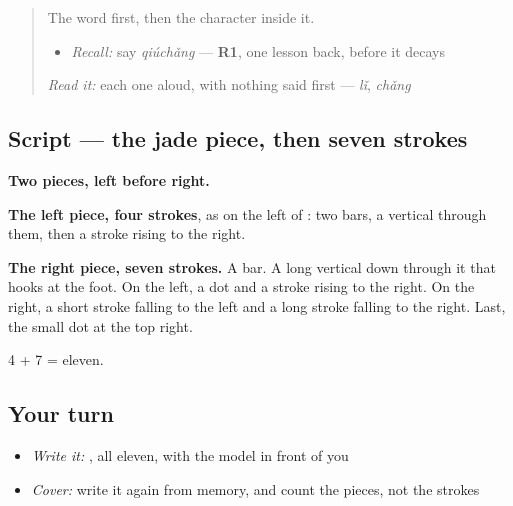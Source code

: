 \label{lesson:ZH-W498-qiu-ball}



\begin{quote}
The word first, then the character inside it.

\begin{itemize}
\raggedright
  \item \emph{Recall:} say \emph{qiúchǎng} — \textbf{R1}, one lesson back, before it decays
\end{itemize}

\begin{quote}
 
\end{quote}

\emph{Read it:} each one aloud, with nothing said first — \emph{lǐ}, \emph{chǎng}
\end{quote}

\subsection*{Script — the jade piece, then seven strokes}

\begin{quote}
\end{quote}

\textbf{Two pieces, left before right.}

\textbf{The left piece, four strokes}, as on the left of : two bars, a vertical through them, then a stroke rising to the right.

\textbf{The right piece, seven strokes.} A bar. A long vertical down through it that hooks at the foot. On the left, a dot and a stroke rising to the right. On the right, a short stroke falling to the left and a long stroke falling to the right. Last, the small dot at the top right.

4 + 7 = eleven.

\subsection*{Your turn}
\begin{itemize}
\raggedright
  \item \emph{Write it:} , all eleven, with the model in front of you
  \item \emph{Cover:} write it again from memory, and count the pieces, not the strokes
\end{itemize}

